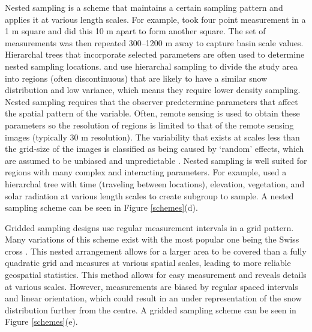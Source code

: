 \documentclass[12pt]{article}
\begin{document}
Nested sampling is a scheme that maintains a certain sampling pattern and applies it at various length scales. For example, \cite{Schweizer2008} took four point measurement in a 1 m square and did this 10 m apart to form another square. The set of measurements was then repeated 300--1200 m away to capture basin scale values. Hierarchal trees that incorporate selected parameters are often used to determine nested sampling locations. \cite{Watson2006} and \cite{Kasurak2011} use hierarchal sampling to divide the study area into regions (often discontinuous) that are likely to have a similar snow distribution and low variance, which means they require lower density sampling. Nested sampling requires that the observer predetermine parameters that affect the spatial pattern of the variable. Often, remote sensing is used to obtain these parameters so the resolution of regions is limited to that of the remote sensing images (typically 30 m resolution). The variability that exists at scales less than the grid-size of the images is classified as being caused by `random' effects, which are assumed to be unbiased and unpredictable \citep{Watson2006}. Nested sampling is well suited for regions with many complex and interacting parameters. For example, \cite{Watson2006} used a hierarchal tree with time (traveling between locations), elevation, vegetation, and solar radiation at various length scales to create subgroup to sample.  A nested sampling scheme can be seen in Figure \ref{schemes}(d). 

Gridded sampling designs use regular measurement intervals in a grid pattern. Many variations of this scheme exist \citep{Molotch2005a, Kronholm2007, Lopez2011} with the most popular one being the Swiss cross \citep{Kronholm2004}. This nested arrangement allows for a larger area to be covered than a fully quadratic grid and measures at various spatial scales, leading to more reliable geospatial statistics. This method allows for easy measurement and reveals details at various scales. However, measurements are biased by regular spaced intervals and linear orientation, which could result in an under representation of the snow distribution further from the centre. A gridded sampling scheme can be seen in Figure \ref{schemes}(e). 
\end{document}
